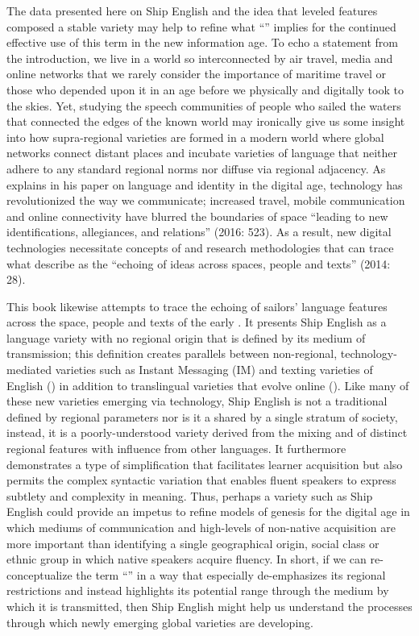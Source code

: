 The data presented here on Ship English and the idea that leveled features composed a stable variety may help to refine what “” implies for the continued effective use of this term in the new information age. To echo a statement from the introduction, we live in a world so interconnected by air travel, media and online networks that we rarely consider the importance of maritime travel or those who depended upon it in an age before we physically and digitally took to the skies. Yet, studying the speech communities of people who sailed the waters that connected the edges of the known world may ironically give us some insight into how supra-regional varieties are formed in a modern world where global networks connect distant places and incubate varieties of language that neither adhere to any standard regional norms nor diffuse via regional adjacency. As \citeauthor{Darvin2016} explains in his paper on language and identity in the digital age, technology has revolutionized the way we communicate; increased travel, mobile communication and online connectivity have blurred the boundaries of space “leading to new identifications, allegiances, and relations” (2016: 523). As a result, new digital technologies necessitate concepts of  and research methodologies that can trace what \citeauthor{StornaiuoloHall2014} describe as the “echoing of ideas across spaces, people and texts” (2014: 28). 

This book likewise attempts to trace the echoing of sailors’ language features across the space, people and texts of the early . It presents Ship English as a language variety with no regional origin that is defined by its medium of transmission; this definition creates parallels between non-regional, technology-mediated varieties such as Instant Messaging (IM) and texting varieties of English (\citealt{WarschauerMatuchniak2010}) in addition to translingual varieties that evolve online (\citealt{Canagarajah2013}).  Like many of these new varieties emerging via technology, Ship English is not a traditional  defined by regional parameters nor is it a  shared by a single stratum of society, instead, it is a poorly-understood variety derived from the mixing and  of distinct regional features with influence from other languages. It furthermore demonstrates a type of simplification that facilitates learner acquisition but also permits the complex syntactic variation that enables fluent speakers to express subtlety and complexity in meaning. Thus, perhaps a variety such as Ship English could provide an impetus to refine models of  genesis for the digital age in which mediums of communication and high-levels of non-native acquisition are more important than identifying a single geographical origin, social class or ethnic group in which native speakers acquire fluency. In short, if we can re-conceptualize the term “” in a way that especially de-emphasizes its regional restrictions and instead highlights its potential range through the medium by which it is transmitted, then Ship English might help us understand the processes through which newly emerging global varieties are developing. 

